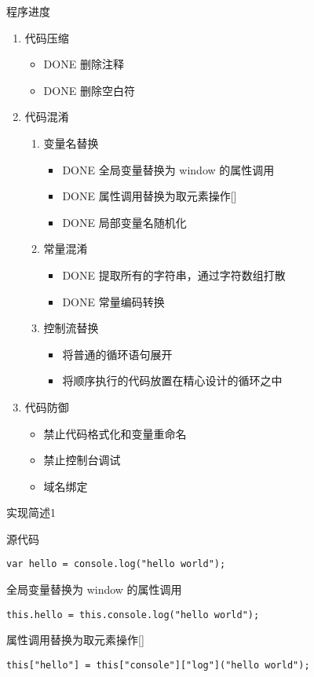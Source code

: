 \documentclass[presentation]{beamer}
\begin{document}
\begin{frame}[label=sec-5]{程序进度}
\begin{enumerate}
\item 代码压缩
\begin{itemize}
\item \alert{DONE} 删除注释
\item \alert{DONE} 删除空白符
\end{itemize}
\item 代码混淆
\begin{enumerate}
\item 变量名替换
\begin{itemize}
\item \alert{DONE} 全局变量替换为 window 的属性调用
\item \alert{DONE} 属性调用替换为取元素操作[]
\item \alert{DONE} 局部变量名随机化
\end{itemize}
\item 常量混淆
\begin{itemize}
\item \alert{DONE} 提取所有的字符串，通过字符数组打散
\item \alert{DONE} 常量编码转换
\end{itemize}
\item 控制流替换
\begin{itemize}
\item \color{red}{TODO} 将普通的循环语句展开
\item \color{red}{TODO} 将顺序执行的代码放置在精心设计的循环之中
\end{itemize}
\end{enumerate}
\item 代码防御
\begin{itemize}
\item \color{red}{TODO} 禁止代码格式化和变量重命名
\item \color{red}{TODO} 禁止控制台调试
\item \color{red}{TODO} 域名绑定
\end{itemize}
\end{enumerate}
\end{frame}
\begin{frame}[fragile,label=sec-6]{实现简述1}
\begin{block}{源代码}
\begin{verbatim}
var hello = console.log("hello world");
\end{verbatim}
\end{block}
\begin{block}{全局变量替换为 window 的属性调用}
\begin{verbatim}
this.hello = this.console.log("hello world");
\end{verbatim}
\end{block}
\begin{block}{属性调用替换为取元素操作[]}
\begin{verbatim}
this["hello"] = this["console"]["log"]("hello world");
\end{verbatim}
\end{block}
\end{frame}
\end{document}
